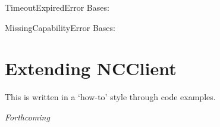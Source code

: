 \documentclass[a4paper,10pt,english]{manual}
\begin{document}
\hypertarget{ncclient.operations.TimeoutExpiredError}{}\begin{excdesc}{TimeoutExpiredError}
Bases: 
\end{excdesc}

\hypertarget{ncclient.operations.MissingCapabilityError}{}\begin{excdesc}{MissingCapabilityError}
Bases: 
\end{excdesc}

\resetcurrentobjects
\hypertarget{--doc-extending}{}

\hypertarget{extending}{}\chapter{Extending NCClient}

This is written in a `how-to' style through code examples.

\emph{Forthcoming}


\renewcommand{\indexname}{Module Index}
\printmodindex
\renewcommand{\indexname}{Index}
\printindex
\end{document}
